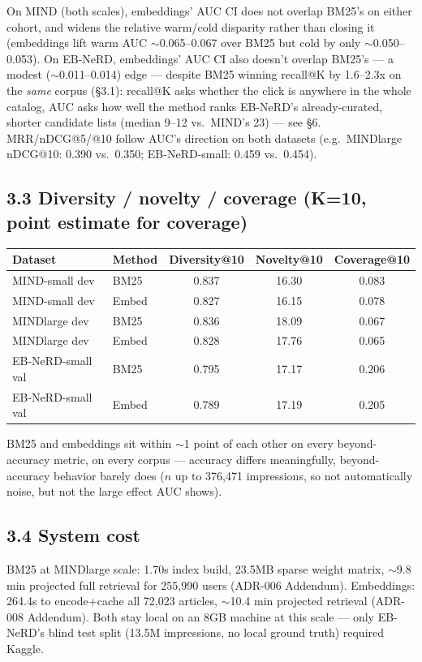 \documentclass[10.5pt]{article}
\begin{document}
On MIND (both scales), embeddings' AUC CI does not overlap BM25's on
either cohort, and widens the relative warm/cold disparity rather than
closing it (embeddings lift warm AUC $\sim$0.065--0.067 over BM25 but
cold by only $\sim$0.050--0.053). On EB-NeRD, embeddings' AUC CI also
doesn't overlap BM25's --- a modest ($\sim$0.011--0.014) edge --- despite
BM25 winning recall@K by 1.6--2.3x on the \emph{same} corpus (\S3.1):
recall@K asks whether the click is anywhere in the whole catalog, AUC
asks how well the method ranks EB-NeRD's already-curated, shorter
candidate lists (median 9--12 vs.\ MIND's 23) --- see \S6. MRR/nDCG@5/@10
follow AUC's direction on both datasets (e.g.\ MINDlarge nDCG@10: 0.390
vs.\ 0.350; EB-NeRD-small: 0.459 vs.\ 0.454).

\subsection*{3.3 Diversity / novelty / coverage (K=10, point estimate for coverage)}

{\footnotesize
\begin{tabular}{@{}llccc@{}}
\toprule
Dataset & Method & Diversity@10 & Novelty@10 & Coverage@10 \\
\midrule
MIND-small dev & BM25 & 0.837 & 16.30 & 0.083 \\
MIND-small dev & Embed & 0.827 & 16.15 & 0.078 \\
MINDlarge dev & BM25 & 0.836 & 18.09 & 0.067 \\
MINDlarge dev & Embed & 0.828 & 17.76 & 0.065 \\
EB-NeRD-small val & BM25 & 0.795 & 17.17 & 0.206 \\
EB-NeRD-small val & Embed & 0.789 & 17.19 & 0.205 \\
\bottomrule
\end{tabular}\par}

BM25 and embeddings sit within $\sim$1 point of each other on every
beyond-accuracy metric, on every corpus --- accuracy differs meaningfully,
beyond-accuracy behavior barely does ($n$ up to 376{,}471 impressions, so
not automatically noise, but not the large effect AUC shows).

\subsection*{3.4 System cost}

BM25 at MINDlarge scale: 1.70s index build, 23.5MB sparse weight matrix,
$\sim$9.8 min projected full retrieval for 255{,}990 users (ADR-006
Addendum). Embeddings: 264.4s to encode+cache all 72{,}023 articles,
$\sim$10.4 min projected retrieval (ADR-008 Addendum). Both stay local on
an 8GB machine at this scale --- only EB-NeRD's blind test split (13.5M
impressions, no local ground truth) required Kaggle.
\end{document}
